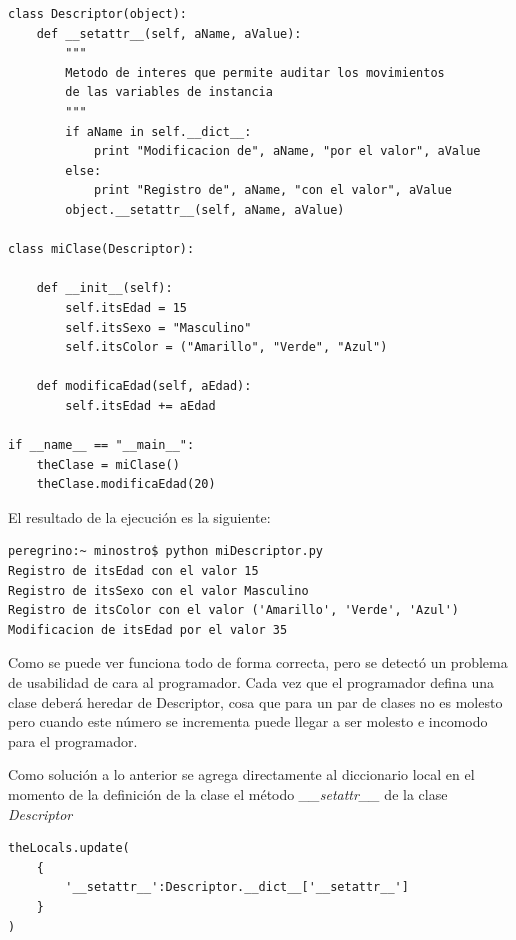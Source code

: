\documentclass[12pt,legalpaper]{report}
\begin{document}
\begin{singlespace}
\begin{lstlisting}[style=Python]
class Descriptor(object):
    def __setattr__(self, aName, aValue):
        """
        Metodo de interes que permite auditar los movimientos
        de las variables de instancia
        """
        if aName in self.__dict__:
            print "Modificacion de", aName, "por el valor", aValue
        else:
            print "Registro de", aName, "con el valor", aValue
        object.__setattr__(self, aName, aValue)

class miClase(Descriptor):
    
    def __init__(self):
        self.itsEdad = 15
        self.itsSexo = "Masculino"
        self.itsColor = ("Amarillo", "Verde", "Azul")
    
    def modificaEdad(self, aEdad):
        self.itsEdad += aEdad

if __name__ == "__main__":
    theClase = miClase()
    theClase.modificaEdad(20)
\end{lstlisting}
\end{singlespace}

El resultado de la ejecución es la siguiente:

\begin{singlespace}
\begin{lstlisting}[style=consola,numbers=none]
peregrino:~ minostro$ python miDescriptor.py
Registro de itsEdad con el valor 15
Registro de itsSexo con el valor Masculino
Registro de itsColor con el valor ('Amarillo', 'Verde', 'Azul')
Modificacion de itsEdad por el valor 35
\end{lstlisting}
\end{singlespace}

Como se puede ver funciona todo de forma correcta, pero se detectó un problema de usabilidad de cara al programador.  Cada vez que el programador defina una clase deberá heredar de Descriptor, cosa que para un par de clases no es molesto pero cuando este número se incrementa puede llegar a ser molesto e incomodo para el programador.

Como solución a lo anterior se agrega directamente al diccionario local en el momento de la definición de la clase el método \textit{\_\_setattr\_\_} de la clase \textit{Descriptor}

\begin{singlespace}
\begin{lstlisting}[style=consola,numbers=none]
theLocals.update(
    {
        '__setattr__':Descriptor.__dict__['__setattr__']
    }
)
\end{lstlisting}
\end{singlespace}
\end{document}
